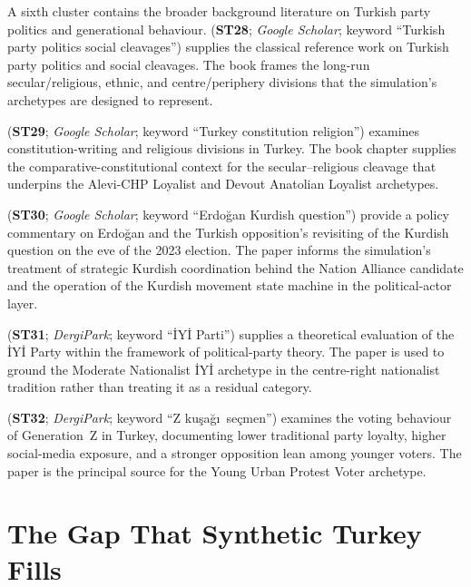 \documentclass[12pt,a4paper]{report}
\begin{document}
A sixth cluster contains the broader background literature on Turkish party politics and generational behaviour. \citet{ozbudun2013cleavages} (\textbf{ST28}; \emph{Google Scholar}; keyword \enquote{Turkish party politics social cleavages}) supplies the classical reference work on Turkish party politics and social cleavages. The book frames the long-run secular/religious, ethnic, and centre/periphery divisions that the simulation's archetypes are designed to represent.

\citet{kuru2017religious} (\textbf{ST29}; \emph{Google Scholar}; keyword \enquote{Turkey constitution religion}) examines constitution-writing and religious divisions in Turkey. The book chapter supplies the comparative-constitutional context for the secular--religious cleavage that underpins the Alevi-CHP Loyalist and Devout Anatolian Loyalist archetypes.

\citet{yegen2022kurdish} (\textbf{ST30}; \emph{Google Scholar}; keyword \enquote{Erdo\u{g}an Kurdish question}) provide a policy commentary on Erdo\u{g}an and the Turkish opposition's revisiting of the Kurdish question on the eve of the 2023 election. The paper informs the simulation's treatment of strategic Kurdish coordination behind the Nation Alliance candidate and the operation of the Kurdish movement state machine in the political-actor layer.

\citet{demir2024iyi} (\textbf{ST31}; \emph{DergiPark}; keyword \enquote{\.IY\.I Parti}) supplies a theoretical evaluation of the \.IY\.I Party within the framework of political-party theory. The paper is used to ground the Moderate Nationalist \.IY\.I archetype in the centre-right nationalist tradition rather than treating it as a residual category.

\citet{hafizoglu2021z} (\textbf{ST32}; \emph{DergiPark}; keyword \enquote{Z ku\c{s}a\u{g}\i\ se\c{c}men}) examines the voting behaviour of Generation~Z in Turkey, documenting lower traditional party loyalty, higher social-media exposure, and a stronger opposition lean among younger voters. The paper is the principal source for the Young Urban Protest Voter archetype.

\section{The Gap That Synthetic Turkey Fills}
\label{sec:gap}
\end{document}
